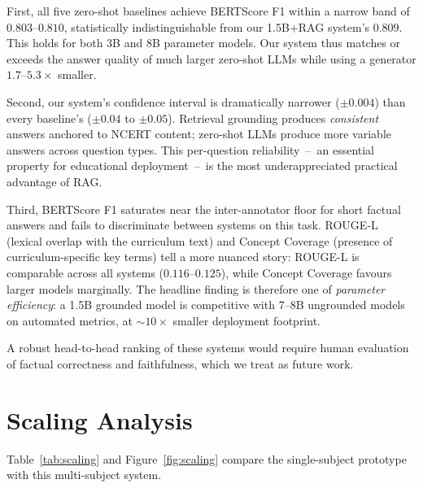 \documentclass[conference]{IEEEtran}
\begin{document}
First, all five zero-shot baselines achieve BERTScore F1 within a narrow band of $0.803$--$0.810$, statistically indistinguishable from our 1.5B+RAG system's $0.809$. This holds for both 3B and 8B parameter models. Our system thus matches or exceeds the answer quality of much larger zero-shot LLMs while using a generator $1.7$--$5.3\times$ smaller.

Second, our system's confidence interval is dramatically narrower ($\pm 0.004$) than every baseline's ($\pm 0.04$ to $\pm 0.05$). Retrieval grounding produces \emph{consistent} answers anchored to NCERT content; zero-shot LLMs produce more variable answers across question types. This per-question reliability~--~an essential property for educational deployment~--~is the most underappreciated practical advantage of RAG.

Third, BERTScore F1 saturates near the inter-annotator floor for short factual answers and fails to discriminate between systems on this task. ROUGE-L (lexical overlap with the curriculum text) and Concept Coverage (presence of curriculum-specific key terms) tell a more nuanced story: ROUGE-L is comparable across all systems ($0.116$--$0.125$), while Concept Coverage favours larger models marginally. The headline finding is therefore one of \emph{parameter efficiency}: a 1.5B grounded model is competitive with 7--8B ungrounded models on automated metrics, at $\sim\!10\times$ smaller deployment footprint.

A robust head-to-head ranking of these systems would require human evaluation of factual correctness and faithfulness, which we treat as future work.

\section{Scaling Analysis}

Table~\ref{tab:scaling} and Figure~\ref{fig:scaling} compare the single-subject prototype with this multi-subject system.
\end{document}

